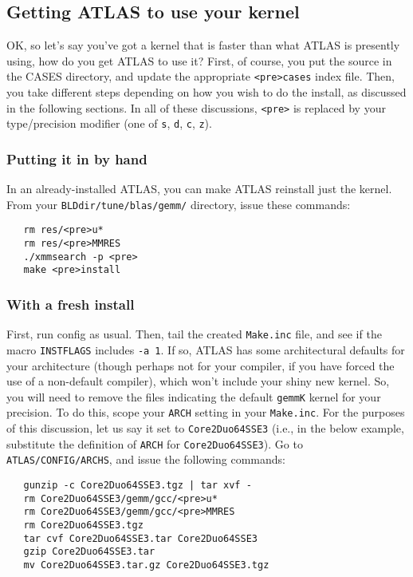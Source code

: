 \documentclass[11pt]{article}
\begin{document}
\subsection{Getting ATLAS to use your kernel}
OK, so let's say you've got a kernel that is faster than what ATLAS is
presently using, how do you get ATLAS to use it?  First, of course, you
put the source in the CASES directory, and update the appropriate
{\tt <pre>cases} index file.  Then, you take different steps depending on
how you wish to do the install, as discussed in the following sections.
In all of these discussions, {\tt <pre>} is replaced by your type/precision
modifier (one of {\tt s}, {\tt d}, {\tt c}, {\tt z}).

\subsubsection{Putting it in by hand}
In an already-installed ATLAS, you can make ATLAS reinstall just the
kernel.  From your {\tt BLDdir/tune/blas/gemm/} directory, issue
these commands:
\begin{verbatim}
   rm res/<pre>u*
   rm res/<pre>MMRES
   ./xmmsearch -p <pre>
   make <pre>install
\end{verbatim}

\subsubsection{With a fresh install}
\label{sec-archdefModify}
First, run config as usual.  Then, tail the created {\tt Make.inc}
file, and see if the macro {\tt INSTFLAGS} includes {\tt -a 1}.  If so,
ATLAS has some architectural defaults for your architecture (though
perhaps not for your compiler, if you have forced the use of a non-default
compiler), which won't include
your shiny new kernel.  So, you will need to remove the files indicating
the default {\tt gemmK} kernel for your precision.  To do this, scope
your {\tt ARCH} setting in your {\tt Make.inc}.  For the purposes of
this discussion, let us say it set to {\tt Core2Duo64SSE3} (i.e., in
the below example, substitute the definition of {\tt ARCH} for
{\tt Core2Duo64SSE3}).  Go to {\tt ATLAS/CONFIG/ARCHS}, and issue
the following commands:
\begin{verbatim}
   gunzip -c Core2Duo64SSE3.tgz | tar xvf -
   rm Core2Duo64SSE3/gemm/gcc/<pre>u* 
   rm Core2Duo64SSE3/gemm/gcc/<pre>MMRES
   rm Core2Duo64SSE3.tgz
   tar cvf Core2Duo64SSE3.tar Core2Duo64SSE3
   gzip Core2Duo64SSE3.tar
   mv Core2Duo64SSE3.tar.gz Core2Duo64SSE3.tgz
\end{verbatim}
\end{document}
